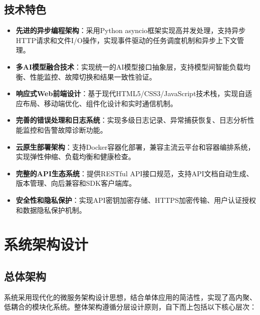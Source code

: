\documentclass[12pt,a4paper]{article}
\begin{document}
\subsection{技术特色}
\begin{itemize}
    \item \textbf{先进的异步编程架构}：采用Python asyncio框架实现高并发处理，支持异步HTTP请求和文件I/O操作，实现事件驱动的任务调度机制和异步上下文管理。
    
    \item \textbf{多AI模型融合技术}：实现统一的AI模型接口抽象层，支持模型间智能负载均衡、性能监控、故障切换和结果一致性验证。
    
    \item \textbf{响应式Web前端设计}：基于现代HTML5/CSS3/JavaScript技术栈，实现自适应布局、移动端优化、组件化设计和实时通信机制。
    
    \item \textbf{完善的错误处理和日志系统}：实现多级日志记录、异常捕获恢复、日志分析性能监控和告警故障诊断功能。
    
    \item \textbf{云原生部署架构}：支持Docker容器化部署，兼容主流云平台和容器编排系统，实现弹性伸缩、负载均衡和健康检查。
    
    \item \textbf{完整的API生态系统}：提供RESTful API接口规范，支持API文档自动生成、版本管理、向后兼容和SDK客户端库。
    
    \item \textbf{安全性和隐私保护}：实现API密钥加密存储、HTTPS加密传输、用户认证授权和数据隐私保护机制。
\end{itemize}

\section{系统架构设计}

\subsection{总体架构}
系统采用现代化的微服务架构设计思想，结合单体应用的简洁性，实现了高内聚、低耦合的模块化系统。整体架构遵循分层设计原则，自下而上包括以下核心层次：
\end{document}
